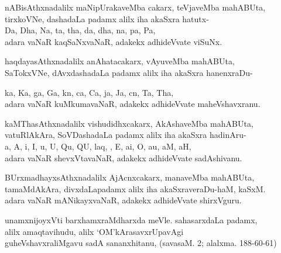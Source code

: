 \begin{entry}
\begin{shl}
nABisAthxnadalilx maNipUrakaveMba cakarx, teVjaveMba mahABUta,\\
tirxkoVNe, dashadaLa padamx alilx iha akaSxra hatutx-\\
Da, Dha, Na, ta, tha, da, dha, na, pa, Pa,\\
adara vaNaR kaqSaNxvaNaR, adakekx adhideVvate viSuNx.
\end{shl}
\smallskip
\begin{shl}
haqdayasAthxnadalilx anAhatacakarx, vAyuveMba mahABUta,\\
SaTokxVNe, dAvxdashadaLa padamx alilx iha akaSxra hanenxraDu-
\end{shl}
\smallskip
\begin{shl}
ka, Ka, ga, Ga, kn, ca, Ca, ja, Ja, cn, Ta, Tha,\\
adara vaNaR kuMkumavaNaR, adakekx adhideVvate maheVshavxranu.
\end{shl}
\smallskip
\begin{shl}
kaMThasAthxnadalilx vishudidhxcakarx, AkAshaveMba mahABUta, \\
vatuRlAkAra, SoVDashadaLa padamx alilx iha akaSxra hadinAru-\\
a, A, i, I, u, U, Qu, QU, laq, \kanO, E, ai, O, au, aM, aH,\\
adara vaNaR shevxVtavaNaR, adakekx adhideVvate sadAshivanu.
\end{shl}
\smallskip
\begin{shl}
BUrxmadhayxsAthxnadalilx AjAcnxcakarx, manaveMba mahABUta, \\
tamaMdAkAra, divxdaLapadamx alilx iha akaSxraveraDu-haM, kaSxM.\\
adara vaNaR mANikayxvaNaR, adakekx adhideVvate shirxVguru.
\end{shl}
\smallskip
\begin{shl}
unamxnijoyxVti barxhamxraMdharxda meVle. sahasarxdaLa padamx,\\
alilx amaqtavihudu, alilx `OM'kArasavxrUpavAgi\\
guheVshavxraliMgavu sadA sananxhitanu, (savasaM. 2; alalxma. 188-60-61)
\end{shl}
\end{entry}


